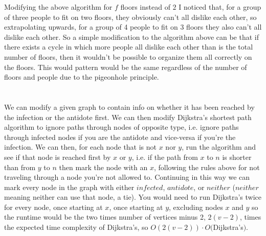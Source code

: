 \documentclass[12pt]{article}
\begin{document}
Modifying the above algorithm for $f$ floors instead of $2$ I noticed that, for a group of three people to fit on two floors, they obviously can't all dislike each other, so extrapolating upwards, for a group of 4 people to fit on 3 floors they also can't all dislike each other. So a simple modification to the algorithm above can be that if there exists a cycle in which more people all dislike each other than is the total number of floors, then it wouldn't be possible to organize them all correctly on the floors. This would pattern would be the same regardless of the number of floors and people due to the pigeonhole principle.

\pagebreak

\section{}

We can modify a given graph to contain info on whether it has been reached by the infection or the antidote first. We can then modify Dijkstra's shortest path algorithm to ignore paths through nodes of opposite type, i.e. ignore paths through infected nodes if you are the antidote and vice-versa if you're the infection. We can then, for each node that is not $x$ nor $y$, run the algorithm and see if that node is reached first by $x$ or $y$, i.e. if the path from $x$ to $n$ is shorter than from $y$ to $n$ then mark the node with an $x$, following the rules above for not traveling through a node you're not allowed to. Continuing in this way we can mark every node in the graph with either $infected$, $antidote$, or $neither$ ($neither$ meaning neither can use that node, a tie). You would need to run Dijkstra's twice for every node, once starting at $x$, once starting at $y$, excluding nodes $x$ and $y$ so the runtime would be the two times number of vertices minus 2, $2(v-2)$, times the expected time complexity of Dijkstra's, so $O(2(v-2))\cdot O($Dijkstra's$)$.

 
\end{document}
